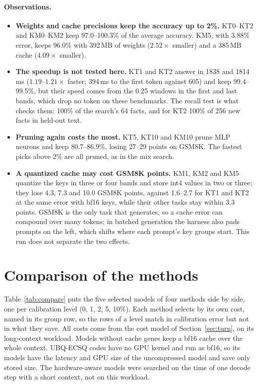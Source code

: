 \documentclass[11pt]{article}
\begin{document}
\FloatBarrier
\paragraph{Observations.}
\begin{itemize}
  \item \textbf{Weights and cache precisions keep the accuracy up to 2\%.} KT0--KT2 and KM0--KM2 keep
        97.0--100.3\% of the average accuracy. KM5, with 3.88\% error, keeps 96.0\% with 392\,MB of weights
        ($2.52\times$ smaller) and a 385\,MB cache ($4.09\times$ smaller).
  \item \textbf{The speedup is not tested here.} KT1 and KT2 answer in 1838 and 1814\,ms ($1.19$--$1.21\times$
        faster; 394\,ms to the first token against 605) and keep 99.4--99.5\%, but their speed comes from the
        0.25 windows in the first and last bands, which drop no token on these benchmarks. The recall test is
        what checks them: 100\% of the search's 64 facts, and for KT2 100\% of 256 new facts in held-out text.
  \item \textbf{Pruning again costs the most.} KT5, KT10 and KM10 prune MLP neurons and keep 80.7--86.9\%,
        losing 27--29 points on GSM8K. The fastest picks above 2\% are all pruned, as in the mix search.
  \item \textbf{A quantized cache may cost GSM8K points.} KM1, KM2 and KM5 quantize the keys in three or
        four bands and store int4 values in two or three; they lose 4.3, 7.3 and 10.0 GSM8K points, against
        1.6--2.7 for KT1 and KT2 at the same error with bf16 keys, while their other tasks stay within 3.3
        points. GSM8K is the only task that generates, so a cache error can compound over many tokens; in
        batched generation the harness also pads prompts on the left, which shifts where each prompt's key
        groups start. This run does not separate the two effects.
\end{itemize}

\clearpage
\section{Comparison of the methods}
\label{sec:compare}

Table~\ref{tab:compare} puts the five selected models of four methods side by side, one per calibration
level (0, 1, 2, 5, 10\%). Each method selects by its own cost, named in its group row, so the rows of a level
match in calibration error but not in what they save. All costs come from the cost model of
Section~\ref{sec:turn}, on its long-context workload. Models without cache genes keep a bf16 cache over the
whole context. UBQ-ECSQ codes have no GPU kernel and run as bf16, so its models have the latency and GPU
size of the uncompressed model and save only stored size. The hardware-aware models were searched on the
time of one decode step with a short context, not on this workload.
\end{document}
